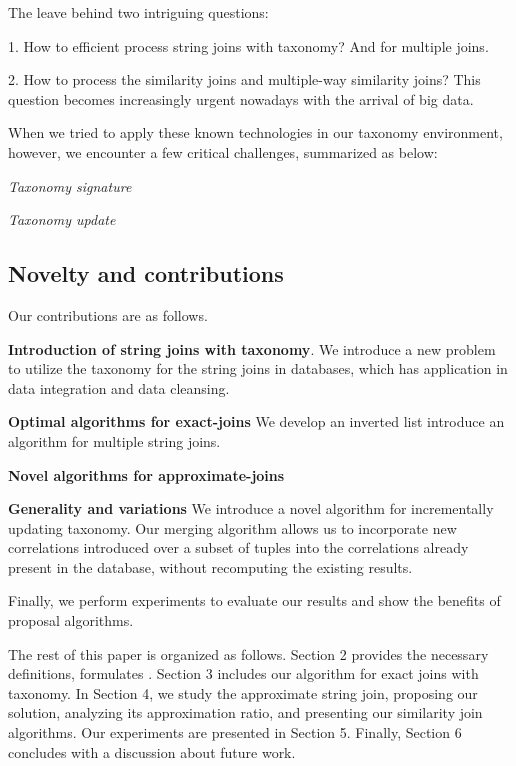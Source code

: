 The leave behind two intriguing questions:

1. How to efficient process string joins with taxonomy? And for multiple joins.


2. How to process the similarity joins and multiple-way similarity joins?  This question becomes increasingly urgent nowadays with the arrival of big data.

When we tried to apply these known technologies in our taxonomy environment, however, we encounter a few critical challenges, summarized as below:

\noindent \textit{Taxonomy signature}

\noindent \textit{Taxonomy update}





\subsection{Novelty and contributions}


\smallskip


Our contributions are as follows.

\noindent \textbf{Introduction of string joins with taxonomy}. We introduce a new problem to utilize the taxonomy for the string joins in databases, which has application in data integration and data cleansing.

\noindent \textbf{Optimal algorithms for exact-joins} We develop an inverted list introduce an algorithm for multiple string joins.

\noindent \textbf{Novel algorithms for approximate-joins}

\noindent \textbf{Generality and variations}  We introduce a novel algorithm for incrementally updating taxonomy. Our merging algorithm allows us to incorporate new correlations introduced over a subset of tuples into
the correlations already present in the database, without recomputing the existing results.


Finally, we perform experiments to evaluate our results and show the benefits of proposal algorithms.


\smallskip

The rest of this paper is organized as follows. Section 2
provides the necessary definitions, formulates . Section
3 includes our algorithm for exact joins with taxonomy. In Section 4, we study
the approximate string join, proposing our solution, analyzing its approximation
ratio, and presenting our similarity join algorithms.
Our experiments are presented in Section 5. Finally,
Section 6 concludes with a discussion about future work.
